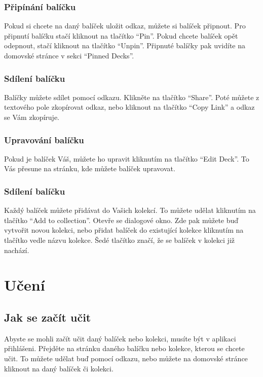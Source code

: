 \documentclass[a4paper,12pt]{article}
\begin{document}
\subsubsection*{Připínání balíčku}
Pokud si chcete na daný balíček uložit odkaz, můžete si balíček připnout. Pro připnutí balíčku stačí kliknout na tlačítko \enquote{Pin}. Pokud chcete balíček opět odepnout, stačí kliknout na tlačítko \enquote{Unpin}. Připnuté balíčky pak uvidíte na domovské stránce v sekci \enquote{Pinned Decks}.

\subsubsection*{Sdílení balíčku}
Balíčky můžete sdílet pomocí odkazu. Klikněte na tlačítko \enquote{Share}. Poté můžete z textového pole zkopírovat odkaz, nebo kliknout na tlačítko \enquote{Copy Link} a odkaz se Vám zkopíruje.

\subsubsection*{Upravování balíčku}
Pokud je balíček Váš, můžete ho upravit kliknutím na tlačítko \enquote{Edit Deck}. To Vás přesune na stránku, kde můžete balíček upravovat.

\subsubsection*{Sdílení balíčku}
Každý balíček můžete přidávat do Vašich kolekcí. To můžete udělat kliknutím na tlačítko \enquote{Add to collection}. Otevře se dialogové okno. Zde pak můžete buď vytvořit novou kolekci, nebo přidat balíček do existující kolekce kliknutím na tlačítko vedle názvu kolekce. Šedé tlačítko značí, že se balíček v kolekci již nachází.

\section{Učení}
\subsection{Jak se začít učit}
Abyste se mohli začít učit daný balíček nebo kolekci, musíte být v aplikaci přihlášeni. Přejděte na stránku daného balíčku nebo kolekce, kterou se chcete učit. To můžete udělat buď pomocí odkazu, nebo můžete na domovské stránce kliknout na daný balíček či kolekci.
\end{document}
